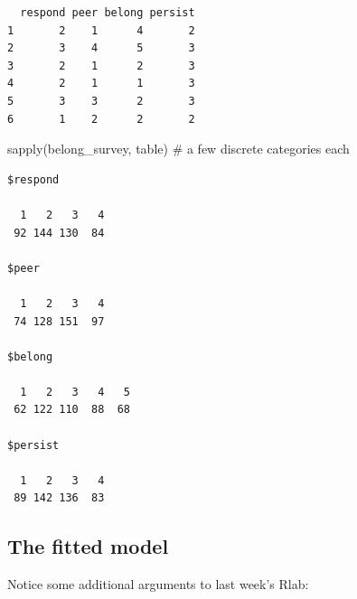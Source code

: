 \documentclass[
  letterpaper,
  DIV=11,
  numbers=noendperiod]{scrartcl}
\newenvironment{Shaded}{\begin{snugshade}}{\end{snugshade}}
\newcommand{\CommentTok}[1]{\textcolor[rgb]{0.37,0.37,0.37}{#1}}
\newcommand{\FunctionTok}[1]{\textcolor[rgb]{0.28,0.35,0.67}{#1}}
\newcommand{\NormalTok}[1]{\textcolor[rgb]{0.00,0.23,0.31}{#1}}
\begin{document}
\begin{verbatim}
  respond peer belong persist
1       2    1      4       2
2       3    4      5       3
3       2    1      2       3
4       2    1      1       3
5       3    3      2       3
6       1    2      2       2
\end{verbatim}

\begin{Shaded}
\begin{Highlighting}[]
\FunctionTok{sapply}\NormalTok{(belong\_survey, table)   }\CommentTok{\# a few discrete categories each}
\end{Highlighting}
\end{Shaded}

\begin{verbatim}
$respond

  1   2   3   4 
 92 144 130  84 

$peer

  1   2   3   4 
 74 128 151  97 

$belong

  1   2   3   4   5 
 62 122 110  88  68 

$persist

  1   2   3   4 
 89 142 136  83 
\end{verbatim}

\subsection{The fitted model}\label{the-fitted-model}

Notice some additional arguments to last week's Rlab:
\end{document}
